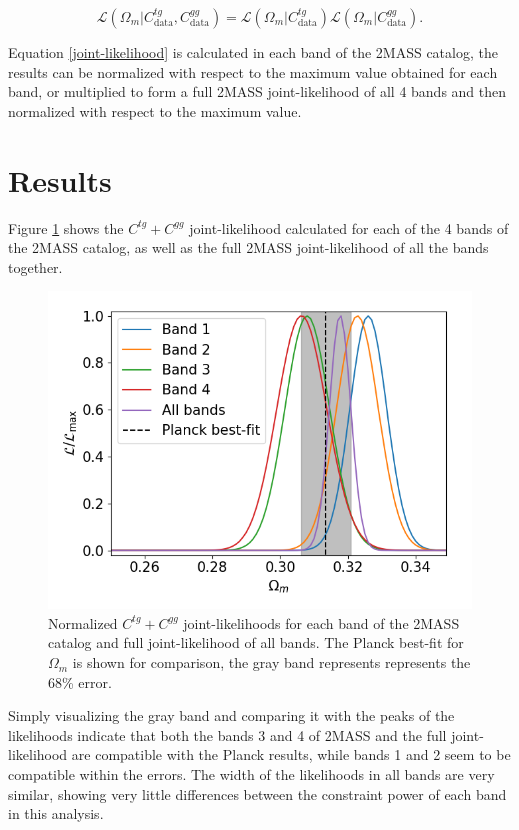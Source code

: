 \documentclass[openany,a4paper,12pt,oneside]{book}
\begin{document}
\begin{spacing}{1.5}
\begin{equation}\label{joint-likelihood}
	\mathcal{L}(\Omega_m|C^{tg}_\text{data},C^{gg}_\text{data})=\mathcal{L}(\Omega_m|C^{tg}_\text{data})\mathcal{L}(\Omega_m|C^{gg}_\text{data}).
\end{equation}

Equation \eqref{joint-likelihood} is calculated in each band of the 2MASS catalog, the results can be normalized with respect to the maximum value obtained for each band, or multiplied to form a full 2MASS joint-likelihood of all 4 bands and then normalized with respect to the maximum value. 

\section{Results}

Figure \ref{fig:likelihood_prof_ctg+cgg} shows the $C^{tg}+C^{gg}$ joint-likelihood calculated for each of the 4 bands of the 2MASS catalog, as well as the full 2MASS joint-likelihood of all the bands together. 

\begin{figure}[!htb]
	\centering
	\includegraphics[width=.7\linewidth]{Imagens/profile_allbands_Nmc2e7.png}
	\caption{Normalized $C^{tg}+C^{gg}$ joint-likelihoods for each band of the 2MASS catalog and full joint-likelihood of all bands. The Planck best-fit for $\Omega_m$ is shown for comparison, the gray band represents represents the 68\% error.}
	\label{fig:likelihood_prof_ctg+cgg}
\end{figure}

Simply visualizing the gray band and comparing it with the peaks of the likelihoods indicate that both the bands 3 and 4 of 2MASS and the full joint-likelihood are compatible with the Planck results, while bands 1 and 2 seem to be compatible within the errors. The width of the likelihoods in all bands are very similar, showing very little differences between the constraint power of each band in this analysis.


\end{spacing}
\end{document}
